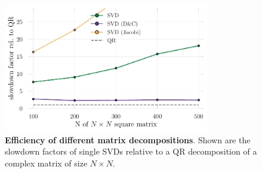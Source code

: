 \documentclass[submission, Phys]{SciPost}
\begin{document}
\begin{figure}
	\includegraphics[width=0.8\textwidth]{figures/benchmark_decomps.pdf}
	\caption{\textbf{Efficiency of different matrix decompositions}. Shown are the slowdown factors of single SVDs relative to a QR decomposition of a complex matrix of size $N \times N$. \label{fig:benchmark_decomps}}
\end{figure}
\end{document}
